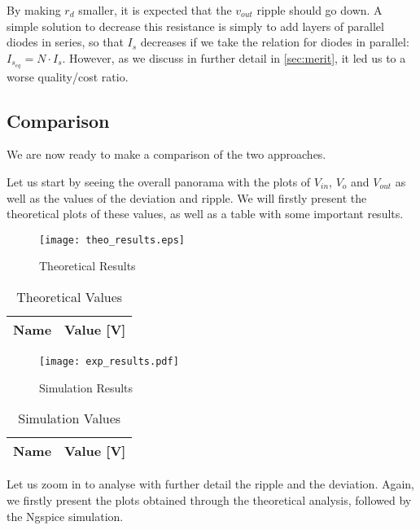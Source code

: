 By making $r_d$ smaller, it is expected that the $v_{out}$ ripple should go down. A simple solution to decrease this resistance is simply to add layers  of parallel diodes in series, so that $I_s$ decreases if we take the relation for diodes in parallel: $I_{s_{eq}}=N \cdot I_s$. However, as we discuss in further detail in \ref{sec:merit}, it led us to a worse quality/cost ratio.

\pagebreak
\subsection{Comparison}
\label{subsec:comparison}

We are now ready to make a comparison of the two approaches.

Let us start by seeing the overall panorama with the plots of $V_{in}$, $V_{o}$ and $V_{out}$ as well as the values of the deviation and ripple. We will firstly present the theoretical plots of these values, as well as a table with some important results.

\begin{figure}[h]
    \centering
  \texttt{[image: theo\_results.eps]}
 \caption{Theoretical Results}
\end{figure}

\begin{table}[h]
    \centering
    \begin{tabular}{|l|c|}
    \hline
    {\bf Name} & {\bf Value [V]} \\ \hline
    
    \end{tabular}
    \caption{Theoretical Values}
    \label{tab:theo_ripple_deviation}
\end{table}
\pagebreak
\begin{figure}[h]
    \centering
  \texttt{[image: exp\_results.pdf]}
  \caption{Simulation Results}
\end{figure}


\begin{table}[h]
    \centering
    \begin{tabular}{|l|c|}
    \hline
    {\bf Name} & {\bf Value [V]} \\ \hline
    
    \end{tabular}
    \caption{Simulation Values}
    \label{tab:exp_ripple_deviation}
\end{table}

Let us zoom in to analyse with further detail the ripple and the deviation. Again, we firstly present the plots obtained through the theoretical analysis, followed by the Ngspice simulation.

